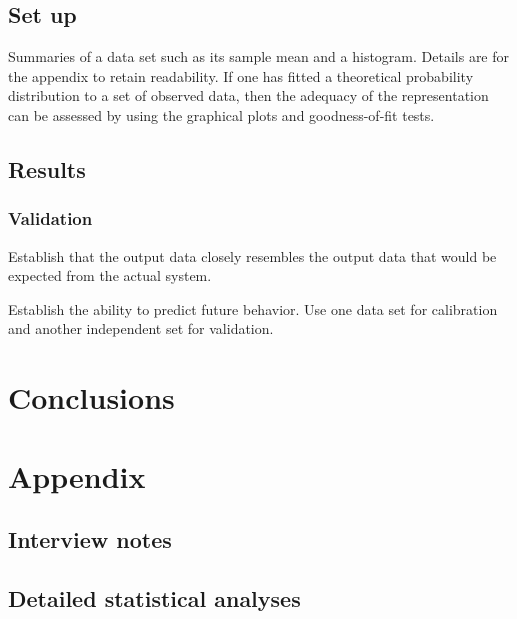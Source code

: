 \documentclass[11pt,a4paper]{article}
\begin{document}
\subsection{Set up}
Summaries of a data set such as its sample mean and a histogram. Details are for the appendix to retain readability. 
If one has fitted a theoretical probability distribution to a set of observed data, then the adequacy of the representation can be assessed by using the graphical plots and goodness-of-fit tests. 
\subsection{Results}

\subsubsection{Validation}
Establish that the output data closely resembles the output data that would be expected from the actual system. 

Establish the ability to predict future behavior. Use one data set for calibration and another independent set for validation.

\section{Conclusions}

\section{Appendix}

\subsection{Interview notes}

\subsection{Detailed statistical analyses}
\end{document}
